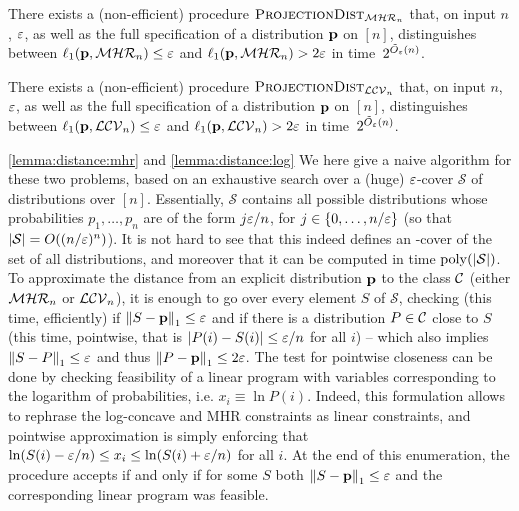 \begin{lemma}[MHR]\label{lemma:distance:mhr}
There exists a (non-efficient) procedure $\estimdist[\classmhr]$ that, on input $n$, $\eps$, as well as the full specification of a distribution $\D$ on $[n]$, distinguishes between $\lp[1](\D,\classmhr) \leq \eps$ and $\lp[1](\D,\classmhr)>2\eps$ in time~$2^{\tilde{O}_\eps(n)}$.
\end{lemma}
\begin{lemma}\label{lemma:distance:log}
There exists a (non-efficient) procedure $\estimdist[\classlogconcave]$ that, on input $n$, $\eps$, as well as the full specification of a distribution $\D$ on $[n]$, distinguishes between $\lp[1](\D,\classlogconcave) \leq \eps$ and $\lp[1](\D,\classlogconcave)>2\eps$ in time~$2^{\tilde{O}_\eps(n)}$.
\end{lemma}
\begin{proofof}{\cref{lemma:distance:mhr} and \cref{lemma:distance:log}}
We here give a naive algorithm for these two problems, based on an exhaustive search over a (huge) $\eps$-cover $\mathcal{S}$ of distributions over $[n]$. Essentially, $\mathcal{S}$ contains all possible distributions whose probabilities $p_1,\dots,p_n$ are of the form $j\eps/n$, for $j\in\{0,\dots,n/\eps\}$ (so that $\abs{\mathcal{S}} = \bigO{(n/\eps)^{n}}$). It is not hard to see that this indeed defines an \eps-cover of the set of all distributions, and moreover that it can be computed in time $\poly(\abs{\mathcal{S}})$. To approximate the distance from an explicit distribution $\D$ to the class $\class$ (either $\classmhr$ or $\classlogconcave$), it is enough to go over every element $S$ of $\mathcal{S}$, checking (this time, efficiently) if $\normone{S-\D}\leq \eps$ and if there is a distribution $P\in\class$ close to $S$ (this time, pointwise, that is $\abs{P(i)-S(i)} \leq \eps/n$ for all $i$) -- which also implies $\normone{S-P}\leq \eps$ and thus $\normone{P-\D}\leq 2\eps$. The test for pointwise closeness can be done by checking feasibility of a linear program with variables corresponding to the logarithm of probabilities, i.e. $x_i \equiv \ln P(i)$. Indeed, this formulation allows to rephrase the log-concave and MHR constraints as linear constraints, and pointwise approximation is simply enforcing that $\ln(S(i)-\eps/n) \leq x_i \leq \ln(S(i)+\eps/n)$ for all $i$. At the end of this enumeration, the procedure accepts if and only if for some $S$ both $\normone{S-\D}\leq \eps$ and the corresponding linear program was feasible.
\end{proofof}

